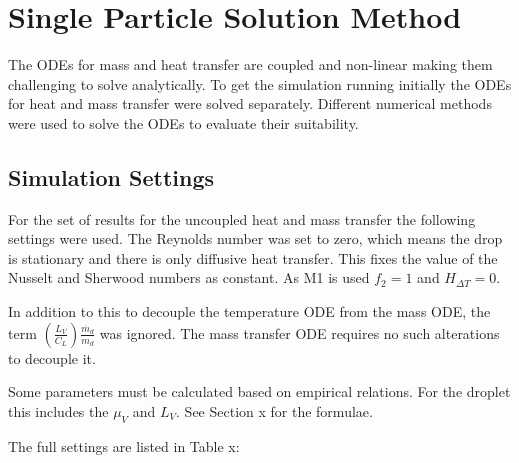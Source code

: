 \documentclass[../Interim_Report_Master]{subfiles}
\begin{document}
\hypertarget{sol_meth}{\section{Single Particle Solution Method}\label{sol_meth}}
The ODEs for mass and heat transfer are coupled and non-linear making them challenging to solve analytically. To get the simulation running initially the ODEs for heat and mass transfer were solved separately. Different numerical methods were used to solve the ODEs to evaluate their suitability.

\subsection{Simulation Settings}
For the set of results for the uncoupled heat and mass transfer the following settings were used. The Reynolds number was set to zero, which means the drop is stationary and there is only diffusive heat transfer. This fixes the value of the Nusselt and Sherwood numbers as constant. As M1 is used $f_2 = 1$ and $H_{\Delta T}=0$. 

In addition to this to decouple the temperature ODE from the mass ODE, the term $\left(\frac{L_V}{C_L}\right)\frac{\dot{m_d}}{m_d}$ was ignored. The mass transfer ODE requires no such alterations to decouple it. 

Some parameters must be calculated based on empirical relations. For the droplet this includes the $\mu_V$ and $L_V$. See Section x for the formulae. 

The full settings are listed in Table x:
\end{document}
